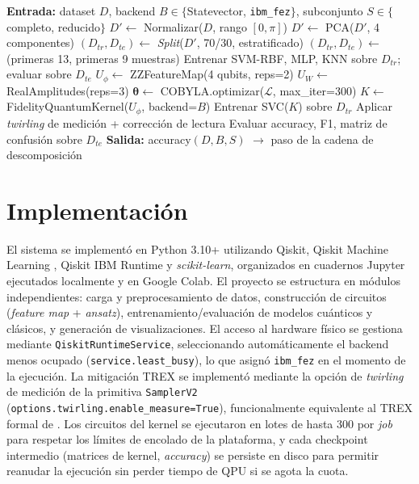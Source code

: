 \documentclass[conference]{IEEEtran}
\begin{document}
\begin{algorithm}[t]
\caption{Protocolo de descomposición de tres puntos (VQC/QSVC vs. clásicos)}
\label{alg:pipeline}
\begin{algorithmic}[1]
\State \textbf{Entrada:} dataset $D$, backend $B\in\{$Statevector, \texttt{ibm\_fez}$\}$, subconjunto $S\in\{$completo, reducido$\}$
\State $D' \gets$ Normalizar($D$, rango $[0,\pi]$)
    \State $D' \gets$ PCA($D'$, 4 componentes)
\EndIf
\State $(D_{tr}, D_{te}) \gets$ \textit{Split}($D'$, 70/30, estratificado)
    \State $(D_{tr}, D_{te}) \gets$ (primeras 13, primeras 9 muestras)
\EndIf
\State Entrenar SVM-RBF, MLP, KNN sobre $D_{tr}$; evaluar sobre $D_{te}$
\State $U_\phi \gets$ ZZFeatureMap(4 qubits, reps=2)
    \State $U_W \gets$ RealAmplitudes(reps=3)
    \State $\boldsymbol{\theta} \gets$ COBYLA.optimizar($\mathcal{L}$, max\_iter=300)
\Else {}
    \State $K \gets$ FidelityQuantumKernel($U_\phi$, backend=$B$)
    \State Entrenar SVC($K$) sobre $D_{tr}$
\EndIf
{}
    \State Aplicar \textit{twirling} de medición + corrección de lectura
\EndIf
\State Evaluar accuracy, F1, matriz de confusión sobre $D_{te}$
\State \textbf{Salida:} accuracy$(D, B, S)$ $\to$ paso de la cadena de descomposición
\end{algorithmic}
\end{algorithm}

\section{Implementación}
\label{sec:implementacion}

El sistema se implementó en Python 3.10+ utilizando Qiskit, Qiskit Machine Learning \cite{qiskit2024}, Qiskit IBM Runtime y \textit{scikit-learn}, organizados en cuadernos Jupyter ejecutados localmente y en Google Colab. El proyecto se estructura en módulos independientes: carga y preprocesamiento de datos, construcción de circuitos (\textit{feature map} + \textit{ansatz}), entrenamiento/evaluación de modelos cuánticos y clásicos, y generación de visualizaciones. El acceso al hardware físico se gestiona mediante \texttt{QiskitRuntimeService}, seleccionando automáticamente el backend menos ocupado (\texttt{service.least\_busy}), lo que asignó \texttt{ibm\_fez} en el momento de la ejecución. La mitigación TREX se implementó mediante la opción de \textit{twirling} de medición de la primitiva \texttt{SamplerV2} (\texttt{options.twirling.enable\_measure=True}), funcionalmente equivalente al TREX formal de \cite{vandenberg2022}. Los circuitos del kernel se ejecutaron en lotes de hasta 300 por \textit{job} para respetar los límites de encolado de la plataforma, y cada checkpoint intermedio (matrices de kernel, \textit{accuracy}) se persiste en disco para permitir reanudar la ejecución sin perder tiempo de QPU si se agota la cuota.
\end{document}
